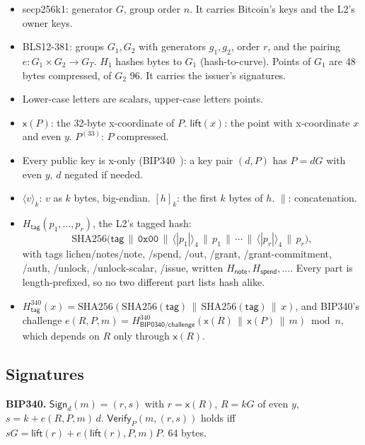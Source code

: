\documentclass[11pt]{article}
\theoremstyle{plain}
\theoremstyle{definition}
\newcommand{\be}[2]{\langle #1\rangle_{#2}}
\newcommand{\pre}[2]{[#1]_{#2}}
\newcommand{\xo}[1]{\mathsf{x}(#1)}
\newcommand{\Ht}[1]{H_{\textsf{#1}}}
\newcommand{\Hb}[1]{H^{340}_{\textsf{#1}}}
\newcommand{\Sign}{\mathsf{Sign}}
\newcommand{\Vfy}{\mathsf{Verify}}
\newcommand{\Hg}{H_{1}}
\begin{document}
\begin{itemize}[nosep]
\item secp256k1: generator $G$, group order $n$. It carries Bitcoin's
  keys and the L2's owner keys.
\item BLS12-381: groups $G_1, G_2$ with generators $g_1, g_2$, order $r$,
  and the pairing $e: G_1 \times G_2 \to G_T$. $\Hg$ hashes bytes to
  $G_1$ (hash-to-curve). Points of $G_1$ are 48 bytes compressed, of
  $G_2$ 96. It carries the issuer's signatures.
\item Lower-case letters are scalars, upper-case letters points.
\item $\xo{P}$: the 32-byte x-coordinate of $P$. $\mathsf{lift}(x)$: the
  point with x-coordinate $x$ and even $y$. $P^{(33)}$: $P$ compressed.
\item Every public key is x-only (BIP340~\cite{bip340}): a key pair $(d,
  P)$ has $P = dG$ with even $y$, $d$ negated if needed.
\item $\be{v}{k}$: $v$ as $k$ bytes, big-endian. $\pre{h}{k}$: the first
  $k$ bytes of $h$. $\|$: concatenation.
\item $\Ht{tag}(p_1, \dots, p_r)$, the L2's tagged hash:
  \[
    \mathrm{SHA256}\big(\textsf{tag} \,\|\, \texttt{0x00} \,\|\, \be{|p_1|}{4}
    \,\|\, p_1 \,\|\, \cdots \,\|\, \be{|p_r|}{4} \,\|\, p_r\big),
  \]
  with tags \textsf{lichen/notes/note}, \textsf{/spend}, \textsf{/out},
  \textsf{/grant}, \textsf{/grant-commitment}, \textsf{/auth},
  \textsf{/unlock}, \textsf{/unlock-scalar}, \textsf{/issue}, written
  $\Ht{note}, \Ht{spend}, \dots$. Every part is length-prefixed, so no
  two different part lists hash alike.
\item $\Hb{tag}(x) = \mathrm{SHA256}(\mathrm{SHA256}(\textsf{tag}) \,\|\,
  \mathrm{SHA256}(\textsf{tag}) \,\|\, x)$, and BIP340's challenge $e(R,
  P, m) = \Hb{BIP0340/challenge}(\xo{R} \,\|\, \xo{P} \,\|\, m) \bmod n$,
  which depends on $R$ only through $\xo{R}$.
\end{itemize}

\subsection{Signatures}

\textbf{BIP340.} $\Sign_d(m) = (r, s)$ with $r = \xo{R}$, $R = kG$ of
even $y$, $s = k + e(R, P, m)\,d$. $\Vfy_P(m, (r, s))$ holds iff $sG =
\mathsf{lift}(r) + e(\mathsf{lift}(r), P, m)P$. 64 bytes.
\end{document}
